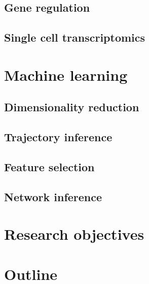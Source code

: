 \subsection{Gene regulation}

\subsection{Single cell transcriptomics}

\section{Machine learning}

\subsection{Dimensionality reduction}

\subsection{Trajectory inference}

\subsection{Feature selection}

\subsection{Network inference}

\section{Research objectives}

\section{Outline} %
